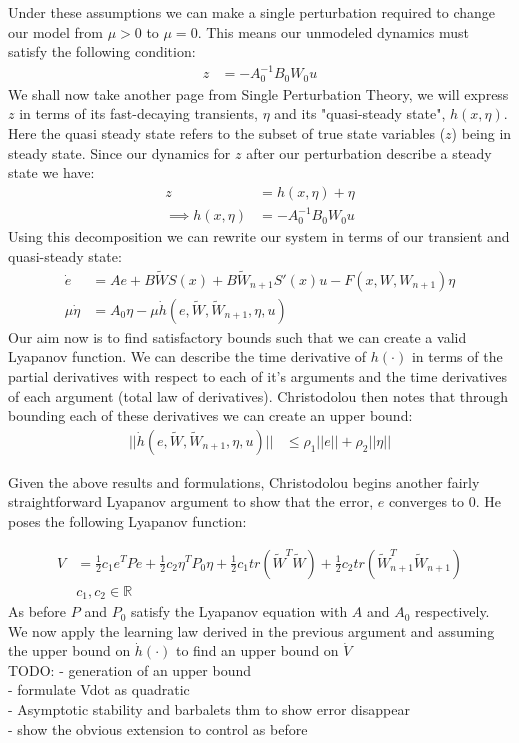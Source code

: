 \documentclass[12pt, letterpaper]{article}
\begin{document}
	Under these assumptions we can make a single perturbation required to change our model from $\mu >0$ to $\mu =0$. This means our unmodeled dynamics must satisfy the following condition:
	\begin{align*}
		z&= -A_{0}^{-1}B_{0}W_{0}u
	\end{align*}
	We shall now take another page from Single Perturbation Theory, we will express $z$ in terms of its fast-decaying transients, $\eta$ and its "quasi-steady state", $h(x,\eta)$. Here the quasi steady state refers to the subset of true state variables ($z$) being in steady state\cite{Koko}. Since our dynamics for $z$ after our perturbation describe a steady state we have:
	\begin{align*}
		z &= h(x,\eta) +\eta \\
		\implies h(x,\eta) &= -A_{0}^{-1}B_{0}W_{0}u
	\end{align*}
	Using this decomposition we can rewrite our system in terms of our transient and quasi-steady state:
	\begin{align*}
		\dot{e} &= Ae+B\tilde{W}S(x)+B\tilde{W}_{n+1}S'(x)u -F(x,W,W_{n+1})\eta \\
		\mu\dot{\eta} &= A_{0}\eta-\mu\dot{h}(e,\tilde{W}, \tilde{W}_{n+1}, \eta,u)
	\end{align*}
	Our aim now is to find satisfactory bounds such that we can create a valid Lyapanov function. We can describe the time derivative of $h(\cdot)$ in terms of the partial derivatives with respect to each of it's arguments and the time derivatives of each argument (total law of derivatives). Christodolou then notes that through bounding each of these derivatives we can create an upper bound:
	\begin{align*}
		||\dot{h}(e,\tilde{W}, \tilde{W}_{n+1}, \eta,u)|| &\leq \rho_{1}||e||+\rho_{2}||\eta||
	\end{align*}
	
	Given the above results and formulations, Christodolou begins another fairly straightforward Lyapanov argument to show that the error, $e$ converges to 0. He poses the following Lyapanov function:
	
	\begin{align*}
		V &= \frac{1}{2}c_{1}e^{T}Pe +\frac{1}{2}c_{2}\eta^{T}P_{0}\eta +\frac{1}{2}c_{1}tr(\tilde{W}^{T}\tilde{W})	+\frac{1}{2}c_{2}tr(\tilde{W}_{n+1}^{T}\tilde{W}_{n+1})\\
		&c_{1},c_{2} \in \mathbb{R}
	\end{align*}
	As before $P$ and $P_{0}$ satisfy the Lyapanov equation with $A$ and $A_{0}$ respectively. We now apply the learning law derived in the previous argument and assuming the upper bound on $\dot{h}(\cdot)$ to find an upper bound on $\dot{V}$\\
	TODO:
	- generation of an upper bound \\
	- formulate Vdot as quadratic\\
	- Asymptotic stability and barbalets thm to show error disappear\\
	- show the obvious extension to control as before\\
	
\end{document}
